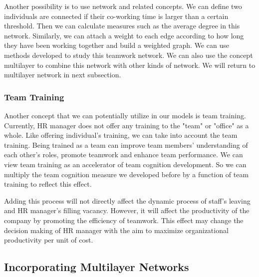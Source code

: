 \documentclass[tcn = 37075, sheet = false, abstract = false]{mcmthesis}
\begin{document}
Another possibility is to use network and related concepts. We can define two individuals are connected if their co-working time is larger than a certain threshold. Then we can calculate measures such as the average degree in this network. Similarly, we can attach a weight to each edge according to how long they have been working together and build a weighted graph. We can use methods developed to study this teamwork network. We can also use the concept multilayer to combine this network with other kinds of network. We will return to multilayer network in next subsection.




\subsubsection{Team Training}

Another concept that we can potentially utilize in our models is team training. Currently, HR manager does not offer any training to the "team" or "office" as a whole. Like offering individual's training, we can take into account the team training. Being trained as a team can improve team members' understanding of each other's roles, promote teamwork and enhance team performance\cite{cooke2004advances}. We can view team training as an accelerator of team cognition development. So we can multiply the team cognition measure we developed before by a function of team training to reflect this effect. 

Adding this process will not directly affect the dynamic process of staff's leaving and HR manager's filling vacancy. However, it will affect the productivity of the company by promoting the efficiency of teamwork. This effect may change the decision making of HR manager with the aim to maximize organizational productivity per unit of cost. 

\subsection{Incorporating Multilayer Networks}
\end{document}

